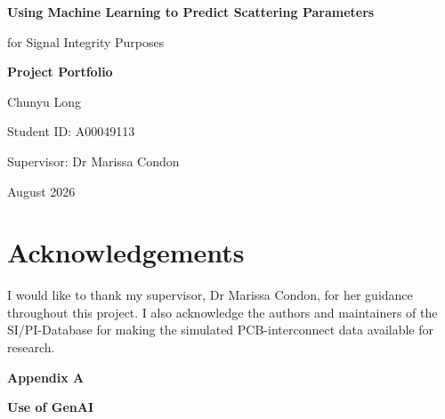 \documentclass[a4paper,journal]{IEEEtran}
\newcommand{\PortfolioAppendixTitle}[2]{%
    \onecolumn
    \thispagestyle{empty}
    \centering
    \vspace*{0.34\textheight}
    {\fontsize{24}{29}\selectfont\bfseries Appendix #1\par}
    \vspace{1.5em}
    {\fontsize{24}{29}\selectfont\bfseries #2\par}
    \clearpage
}
\newcommand{\StartAppendixPages}[1]{%
    \renewcommand{\thepage}{#1.\arabic{page}}%
    \setcounter{page}{1}%
    \pagestyle{portfolioappendix}%
}
\begin{document}
\onecolumn
{}
\makeatletter
\renewcommand{\@pnumwidth}{3em}
\makeatother

\begin{titlepage}
    \thispagestyle{empty}
    \centering
    \vspace*{0.22\textheight}
    {\fontsize{24}{29}\selectfont\bfseries
      Using Machine Learning to Predict Scattering Parameters\par
      for Signal Integrity Purposes\par}
    \vspace{2.2em}
    {\fontsize{24}{29}\selectfont\bfseries Project Portfolio\par}
    \vfill
    {\large Chunyu Long\par}
    \vspace{0.5em}
    {\large Student ID: A00049113\par}
    \vspace{1.5em}
    {\large Supervisor: Dr Marissa Condon\par}
    \vspace{1.5em}
    {\large August 2026\par}
    \vspace*{0.08\textheight}
\end{titlepage}

\section*{Acknowledgements}
I would like to thank my supervisor, Dr Marissa Condon, for her guidance
throughout this project. I also acknowledge the authors and maintainers of the
SI/PI-Database for making the simulated PCB-interconnect data available for
research.

\clearpage
\tableofcontents

\clearpage
{}
\setcounter{page}{1}


\PortfolioAppendixTitle{A}{Use of GenAI}
\StartAppendixPages{A}

\end{document}
